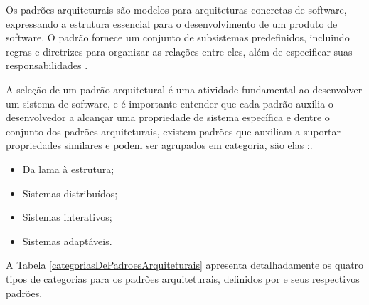 Os padrões arquiteturais são modelos para arquiteturas concretas de software, expressando a estrutura essencial para o desenvolvimento de um produto de software. O padrão fornece um conjunto de subsistemas predefinidos, incluindo regras e diretrizes para organizar as relações entre eles, além de especificar suas responsabilidades \cite{buschmann1996system}. 

A seleção de um padrão arquitetural é uma atividade fundamental ao desenvolver um sistema de software, e é importante entender que cada padrão auxilia o desenvolvedor a alcançar uma propriedade de sistema específica e dentre o conjunto dos padrões arquiteturais, existem padrões que auxiliam a suportar propriedades similares e podem ser agrupados em categoria, são elas \cite{buschmann1996system}:.

\begin{itemize}
	\item Da lama à estrutura;
	\item Sistemas distribuídos;
	\item Sistemas interativos;
	\item Sistemas adaptáveis.
\end{itemize}

A Tabela \ref{categoriasDePadroesArquiteturais} apresenta detalhadamente os quatro tipos de categorias para os padrões arquiteturais, definidos por \cite{buschmann1996system} e seus respectivos padrões.

